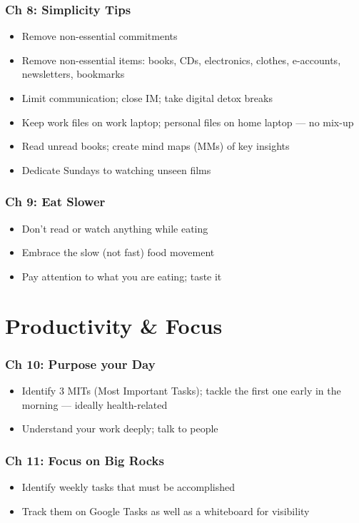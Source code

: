 \begin{frame}[fragile]
\frametitle{Ch 8: Simplicity Tips}
\begin{itemize}
\item Remove non-essential commitments
\item Remove non-essential items: books, CDs, electronics, clothes, e-accounts, newsletters, bookmarks
\item Limit communication; close IM; take digital detox breaks
\item Keep work files on work laptop; personal files on home laptop --- no mix-up
\item Read unread books; create mind maps (MMs) of key insights
\item Dedicate Sundays to watching unseen films
\end{itemize}
\end{frame}

\begin{frame}[fragile]
\frametitle{Ch 9: Eat Slower}
\begin{itemize}
\item Don't read or watch anything while eating
\item Embrace the slow (not fast) food movement
\item Pay attention to what you are eating; taste it
\end{itemize}
\end{frame}

\section{Productivity \& Focus}

\begin{frame}[fragile]
\frametitle{Ch 10: Purpose your Day}
\begin{itemize}
\item Identify 3 MITs (Most Important Tasks); tackle the first one early in the morning --- ideally health-related
\item Understand your work deeply; talk to people
\end{itemize}
\end{frame}

\begin{frame}[fragile]
\frametitle{Ch 11: Focus on Big Rocks}
\begin{itemize}
\item Identify weekly tasks that must be accomplished
\item Track them on Google Tasks as well as a whiteboard for visibility
\end{itemize}
\end{frame}

